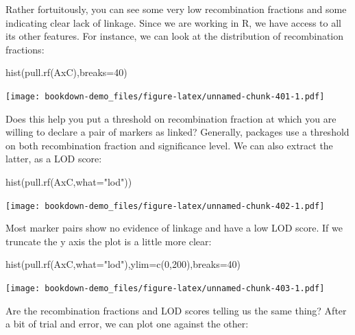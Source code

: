 \documentclass[
]{book}
\newenvironment{Shaded}{\begin{snugshade}}{\end{snugshade}}
\newcommand{\AttributeTok}[1]{\textcolor[rgb]{0.77,0.63,0.00}{#1}}
\newcommand{\DecValTok}[1]{\textcolor[rgb]{0.00,0.00,0.81}{#1}}
\newcommand{\FunctionTok}[1]{\textcolor[rgb]{0.00,0.00,0.00}{#1}}
\newcommand{\NormalTok}[1]{#1}
\newcommand{\StringTok}[1]{\textcolor[rgb]{0.31,0.60,0.02}{#1}}
\begin{document}
Rather fortuitously, you can see some very low recombination fractions and some indicating clear lack of linkage. Since we are working in R, we have access to all its other features. For instance, we can look at the distribution of recombination fractions:

\begin{Shaded}
\begin{Highlighting}[]
\FunctionTok{hist}\NormalTok{(}\FunctionTok{pull.rf}\NormalTok{(AxC),}\AttributeTok{breaks=}\DecValTok{40}\NormalTok{) }
\end{Highlighting}
\end{Shaded}

\texttt{[image: bookdown-demo\_files/figure-latex/unnamed-chunk-401-1.pdf]}

Does this help you put a threshold on recombination fraction at which you are willing to declare a pair of markers as linked? Generally, packages use a threshold on both recombination fraction and significance level. We can also extract the latter, as a LOD score:

\begin{Shaded}
\begin{Highlighting}[]
\FunctionTok{hist}\NormalTok{(}\FunctionTok{pull.rf}\NormalTok{(AxC,}\AttributeTok{what=}\StringTok{"lod"}\NormalTok{)) }
\end{Highlighting}
\end{Shaded}

\texttt{[image: bookdown-demo\_files/figure-latex/unnamed-chunk-402-1.pdf]}

Most marker pairs show no evidence of linkage and have a low LOD score. If we truncate the y axis the plot is a little more clear:

\begin{Shaded}
\begin{Highlighting}[]
\FunctionTok{hist}\NormalTok{(}\FunctionTok{pull.rf}\NormalTok{(AxC,}\AttributeTok{what=}\StringTok{"lod"}\NormalTok{),}\AttributeTok{ylim=}\FunctionTok{c}\NormalTok{(}\DecValTok{0}\NormalTok{,}\DecValTok{200}\NormalTok{),}\AttributeTok{breaks=}\DecValTok{40}\NormalTok{) }
\end{Highlighting}
\end{Shaded}

\texttt{[image: bookdown-demo\_files/figure-latex/unnamed-chunk-403-1.pdf]}

Are the recombination fractions and LOD scores telling us the same thing? After a bit of trial and error, we can plot one against the other:
\end{document}
